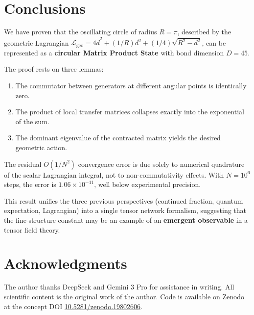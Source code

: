 \documentclass[12pt]{article}
\begin{document}
\section{Conclusions}

We have proven that the oscillating circle of radius $R = \pi$, described by the
geometric Lagrangian $\mathcal{L}_{\text{geo}} = 4\dot{d}^2 + (1/R)d^2 + (1/4)\sqrt{R^2-d^2}$,
can be represented as a \textbf{circular Matrix Product State} with bond dimension
$D = 45$.

The proof rests on three lemmas:
\begin{enumerate}
    \item The commutator between generators at different angular points is identically zero.
    \item The product of local transfer matrices collapses exactly into the exponential
    of the sum.
    \item The dominant eigenvalue of the contracted matrix yields the desired geometric
    action.
\end{enumerate}

The residual $O(1/N^2)$ convergence error is due solely to numerical quadrature of the
scalar Lagrangian integral, not to non-commutativity effects. With $N = 10^6$ steps,
the error is $1.06\times10^{-11}$, well below experimental precision.

This result unifies the three previous perspectives (continued fraction, quantum
expectation, Lagrangian) into a single tensor network formalism, suggesting that the
fine-structure constant may be an example of an \textbf{emergent observable} in a
tensor field theory.

\section*{Acknowledgments}

The author thanks DeepSeek and Gemini 3 Pro for assistance in writing. All scientific
content is the original work of the author. Code is available on Zenodo at the concept
DOI \href{https://doi.org/10.5281/zenodo.19802606}{10.5281/zenodo.19802606}.
\end{document}
